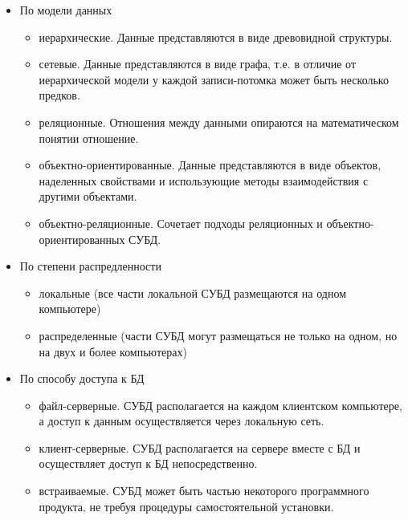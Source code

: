 \begin{itemize}
  \item По модели данных
    \begin{itemize}
      \item иерархические. Данные представляются в виде древовидной структуры.
      \item сетевые. Данные представляются в виде графа, т.е. в отличие от иерархической модели у каждой записи-потомка может быть несколько предков.
      \item реляционные. Отношения между данными опираются на математическом понятии отношение.
      \item объектно-ориентированные. Данные представляются в виде объектов, наделенных свойствами и использующие методы взаимодействия с другими объектами.
      \item объектно-реляционные. Сочетает подходы реляционных и объектно-ориентированных СУБД.
    \end{itemize}
  \item По степени распредленности
    \begin{itemize}
      \item локальные (все части локальной СУБД размещаются на одном компьютере)
      \item распределенные (части СУБД могут размещаться не только на одном, но на двух и более компьютерах)
    \end{itemize}
  \item По способу доступа к БД
    \begin{itemize}
      \item файл-серверные. СУБД располагается на каждом клиентском компьютере, а доступ к данным осуществляется через локальную сеть.
      \item клиент-серверные. СУБД располагается на сервере вместе с БД и осуществляет доступ к БД непосредственно.
      \item встраиваемые. СУБД может быть частью некоторого программного продукта, не требуя процедуры самостоятельной установки.
    \end{itemize}
\end{itemize}

